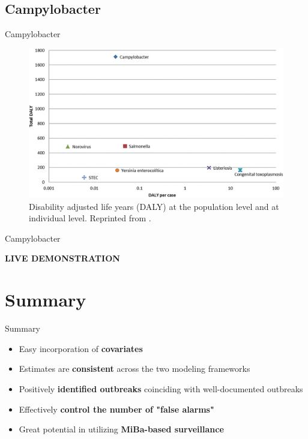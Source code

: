 \documentclass[aspectratio=169]{beamer}
\begin{document}
\hypertarget{campylobacter}{%
\subsection{Campylobacter}\label{campylobacter}}

\begin{frame}{Campylobacter}
\tiny

\begin{figure}[H]
\includegraphics[width=0.7\linewidth]{../figures/DALY} \caption{Disability adjusted life years (DALY) at the population level and at individual level. Reprinted from \cite{Pires_2020}.}\label{fig:DALY}
\end{figure}

\normalsize
\end{frame}

\begin{frame}{Campylobacter}
\protect\hypertarget{campylobacter-1}{}
\center

\huge\textbf{LIVE DEMONSTRATION}
\end{frame}

\hypertarget{summary}{%
\section{Summary}\label{summary}}

\begin{frame}{Summary}
\begin{itemize}
  \item Easy incorporation of \textbf{covariates}
  \item Estimates are \textbf{consistent} across the two modeling frameworks
  \item Positively \textbf{identified outbreaks} coinciding with well-documented outbreaks
  \item Effectively \textbf{control the number of "false alarms"}
  \item Great potential in utilizing \textbf{MiBa-based surveillance}
\end{itemize}
\end{frame}
\end{document}
